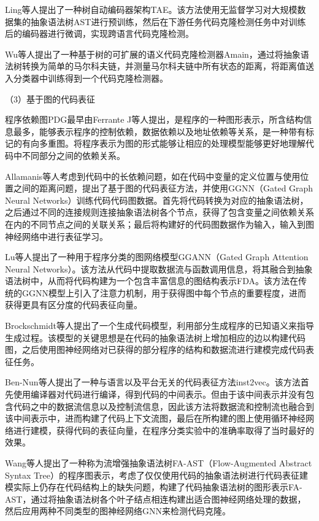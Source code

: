 Ling等人\cite{Ling2022ImproveRF}提出了一种树自动编码器架构TAE。该方法使用无监督学习对大规模数据集的抽象语法树AST进行预训练，然后在下游任务代码克隆检测任务中对训练后的编码器进行微调，实现跨语言代码克隆检测。

Wu等人\cite{10.1145/3551349.3560426}提出了一种基于树的可扩展的语义代码克隆检测器Amain，通过将抽象语法树转换为简单的马尔科夫链，并测量马尔科夫链中所有状态的距离，将距离值送入分类器中训练得到一个代码克隆检测器。

（3）基于图的代码表征

程序依赖图PDG最早由Ferrante J等人\cite{10.1145/24039.24041}提出，是程序的一种图形表示，所含结构信息最多，能够表示程序的控制依赖，数据依赖以及地址依赖等关系，是一种带有标记的有向多重图。将程序表示为图的形式能够让相应的处理模型能够更好地理解代码中不同部分之间的依赖关系。

Allamanis等人\cite{Allamanis2017LearningTR}考虑到代码中的长依赖问题，如在代码中变量的定义位置与使用位置之间的距离问题，提出了基于图的代码表征方法，并使用GGNN（Gated Graph Neural Networks）训练代码代码图数据。首先将代码转换为对应的抽象语法树，之后通过不同的连接规则连接抽象语法树各个节点，获得了包含变量之间依赖关系在内的不同节点之间的关联关系；最后将构建好的代码图数据作为输入，输入到图神经网络中进行表征学习。

Lu等人\cite{Lu2019ProgramCU}提出了一种用于程序分类的图网络模型GGANN（Gated Graph Attention Neural Networks）。该方法从代码中提取数据流与函数调用信息，将其融合到抽象语法树中，从而将代码构建为一个包含丰富信息的图结构表示FDA。该方法在传统的GGNN模型上引入了注意力机制，用于获得图中每个节点的重要程度，进而获得更具有区分度的代码表征向量。

Brockschmidt等人\cite{Brockschmidt2018GenerativeCM}提出了一个生成代码模型，利用部分生成程序的已知语义来指导生成过程。该模型的关键思想是在代码的抽象语法树上增加相应的边以构建代码图，之后使用图神经网络对已获得的部分程序的结构和数据流进行建模完成代码表征任务。

Ben-Nun等人\cite{10.5555/3327144.3327276}提出了一种与语言以及平台无关的代码表征方法inst2vec。该方法首先使用编译器对代码进行编译，得到代码的中间表示。但由于该中间表示并没有包含代码之中的数据流信息以及控制流信息，因此该方法将数据流和控制流也融合到该中间表示中，进而构建了代码上下文流图，最后在所构建的图上使用循环神经网络进行建模，获得代码的表征向量，在程序分类实验中的准确率取得了当时最好的效果。

Wang等人\cite{9054857}提出了一种称为流增强抽象语法树FA-AST（Flow-Augmented Abstract Syntax Tree）的程序图表示，考虑了仅仅使用代码的抽象语法树进行代码表征建模实际上仍存在代码结构上的缺失问题，构建了代码抽象语法树的图形表示FA-AST，通过将抽象语法树各个叶子结点相连构建出适合图神经网络处理的数据，然后应用两种不同类型的图神经网络GNN来检测代码克隆。

